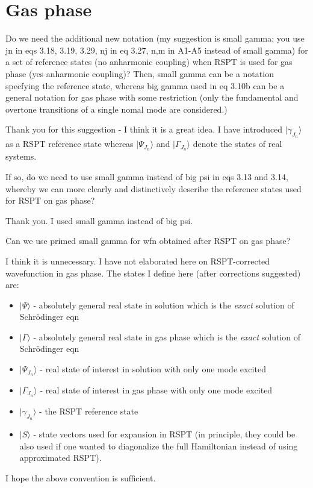 \documentclass{exam}
\begin{document}
\section{Gas phase}
\begin{questions}

%
\question Do we need the additional new notation (my suggestion is small gamma; you use jn in eqs 3.18, 3.19, 3.29, nj in eq 3.27, n,m in A1-A5 instead of small gamma) for a set of reference states (no anharmonic coupling) when RSPT is used for gas phase (yes anharmonic coupling)? Then, small gamma can be a  notation specfying the reference state, whereas big gamma used in eq 3.10b can be a general notation for gas phase with some restriction (only the fundamental and overtone transitions of a single nomal mode are considered.)

\begin{solution}
Thank you for this suggestion - I think it is a great idea. I have introduced $\vert \gamma_{J_n}\rangle$
as a RSPT reference state whereas $\vert \Psi_{J_n}\rangle$ and $\vert \Gamma_{J_n}\rangle$ denote the states of real systems.
\end{solution}

%
\question If so, do we need to use small gamma instead of big psi in eqs 3.13 and 3.14, whereby we can more clearly and distinctively describe the reference states used for RSPT on gas phase?

\begin{solution}
Thank you. I used small gamma instead of big psi.
\end{solution}

%
\question Can we use primed small gamma for wfn obtained after RSPT on gas phase?

\begin{solution}
I think it is unnecessary. I have not elaborated here on RSPT-corrected wavefunction
in gas phase. The states I define here (after corrections suggested) are:
%
\begin{itemize}
 \item $\vert \Psi \rangle$        - absolutely general real state in solution which is the \emph{exact} solution of Schr{\"o}dinger eqn
 \item $\vert \Gamma \rangle$      - absolutely general real state in gas phase which is the \emph{exact} solution of Schr{\"o}dinger eqn
 \item $\vert \Psi_{J_n}\rangle$   - real state of interest in solution with only one mode excited
 \item $\vert \Gamma_{J_n}\rangle$ - real state of interest in gas phase with only one mode excited
 \item $\vert \gamma_{J_n}\rangle$ - the RSPT reference state 
 \item $\vert S\rangle$            - state vectors used for expansion in RSPT (in principle, they could be also used if one wanted to 
                                     diagonalize the full Hamiltonian instead of using approximated RSPT).
\end{itemize}
%
I hope the above convention is sufficient.
\end{solution}

\end{questions}
\end{document}
